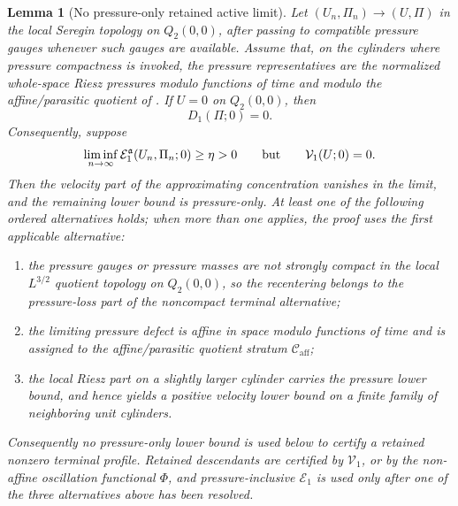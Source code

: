 \documentclass[11pt]{amsart}
\numberwithin{equation}{section}
\theoremstyle{plain}
\newtheorem{lemma}[lemma]{Lemma}
\theoremstyle{definition}
\theoremstyle{remark}
\newcommand{\calE}{\mathcal E}
\newcommand{\Vel}{\mathcal V}
\newcommand{\Caff}{\mathcal C_{\mathrm{aff}}}
\begin{document}
\begin{lemma}[No pressure-only retained active limit]
\label{lem:no-pressure-only-retained-profile}
Let \((U_n,\Pi_n)\to(U,\Pi)\) in the local Seregin topology on \(Q_2(0,0)\),
after passing to compatible pressure gauges whenever such gauges are available.
Assume that, on the cylinders where pressure compactness is invoked, the
pressure representatives are the normalized whole-space Riesz pressures modulo
functions of time and modulo the affine/parasitic quotient of
.
If \(U=0\) on \(Q_2(0,0)\), then
\[
   D_1(\Pi;0)=0 .
\]
Consequently, suppose
\[
   \liminf_{n\to\infty}\calE_1^{\mathfrak a}(U_n,\Pi_n;0)\ge\eta>0
   \qquad\hbox{but}\qquad
   \Vel_1(U;0)=0 .
\]
Then the velocity part of the approximating concentration vanishes in the
limit, and the remaining lower bound is pressure-only.  At least one of the
following ordered alternatives holds; when more than one applies, the proof
uses the first applicable alternative:
\begin{enumerate}[label=\textup{(\roman*)}]
   \item the pressure gauges or pressure masses are not strongly compact in the
   local \(L^{3/2}\) quotient topology on \(Q_2(0,0)\), so the recentering
   belongs to the pressure-loss part of the noncompact terminal alternative;
   \item the limiting pressure defect is affine in space modulo functions of
   time and is assigned to the affine/parasitic quotient stratum \(\Caff\);
   \item the local Riesz part on a slightly larger cylinder carries the
   pressure lower bound, and hence yields a positive velocity lower bound on
   a finite family of neighboring unit cylinders.
\end{enumerate}
Consequently no pressure-only lower bound is used below to certify a retained
nonzero terminal profile.  Retained descendants are certified by \(\Vel_1\), or
by the non-affine oscillation functional \(\Phi\), and pressure-inclusive
\(\calE_1\) is used only after one of the three alternatives above has been
resolved.
\end{lemma}
\end{document}
